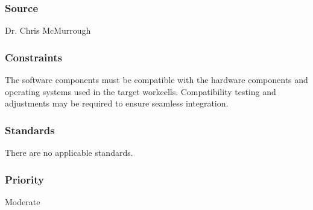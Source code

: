 \subsubsection{Source}
Dr. Chris McMurrough
\subsubsection{Constraints}
The software components must be compatible with the hardware components and operating systems used in the target workcells. Compatibility testing and adjustments may be required to ensure seamless integration.
\subsubsection{Standards}
There are no applicable standards.
\subsubsection{Priority}
Moderate